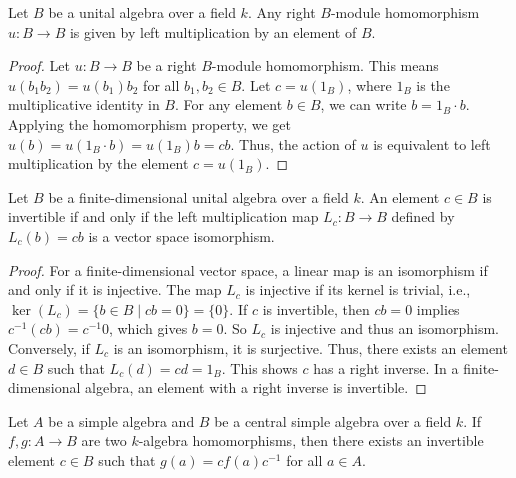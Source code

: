 \begin{lemma}
    \label{lem:Right_Module_Homomorphisms_on_Algebra}
    Let $B$ be a unital algebra over a field $k$. Any right $B$-module homomorphism $u: B \to B$ is given by left multiplication by an element of $B$.
\end{lemma}

\begin{proof}
    Let $u: B \to B$ be a right $B$-module homomorphism. This means $u(b_1 b_2) = u(b_1) b_2$ for all $b_1, b_2 \in B$. Let $c = u(1_B)$, where $1_B$ is the multiplicative identity in $B$. For any element $b \in B$, we can write $b = 1_B \cdot b$. Applying the homomorphism property, we get $u(b) = u(1_B \cdot b) = u(1_B) b = c b$. Thus, the action of $u$ is equivalent to left multiplication by the element $c = u(1_B)$.
\end{proof}

\begin{lemma}
    \label{lem:Invertibility_of_Left_Multiplication_Map}
    Let $B$ be a finite-dimensional unital algebra over a field $k$. An element $c \in B$ is invertible if and only if the left multiplication map $L_c: B \to B$ defined by $L_c(b) = cb$ is a vector space isomorphism.
\end{lemma}

\begin{proof}
    For a finite-dimensional vector space, a linear map is an isomorphism if and only if it is injective. The map $L_c$ is injective if its kernel is trivial, i.e., $\ker(L_c) = \{b \in B \mid cb = 0\} = \{0\}$.
    If $c$ is invertible, then $cb = 0$ implies $c^{-1}(cb) = c^{-1}0$, which gives $b=0$. So $L_c$ is injective and thus an isomorphism.
    Conversely, if $L_c$ is an isomorphism, it is surjective. Thus, there exists an element $d \in B$ such that $L_c(d) = cd = 1_B$. This shows $c$ has a right inverse. In a finite-dimensional algebra, an element with a right inverse is invertible.
\end{proof}

\begin{theorem}
    \label{thm:Skolem-Noether}
    Let $A$ be a simple algebra and $B$ be a central simple algebra over a field $k$. If $f, g: A \to B$ are two $k$-algebra homomorphisms, then there exists an invertible element $c \in B$ such that $g(a) = c f(a) c^{-1}$ for all $a \in A$.
\end{theorem}

